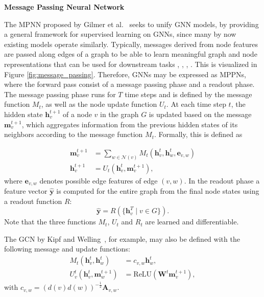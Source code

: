 \textbf{Message Passing Neural Network}\par
The \ac{MPNN} proposed by Gilmer et al.~\cite{gilmer2017neural} seeks to unify GNN models, by providing a general framework for supervised learning on GNNs, since many by now existing models operate similarly. Typically, messages derived from node features are passed along edges of a graph to be able to learn meaningful graph and node representations that can be used for downstream tasks \cite{kipf2016semi}, \cite{4700287}, \cite{velivckovic2017graph}, \cite{xu2018powerful}. This is visualized in Figure \ref{fig:message_passing}. Therefore, GNNs may be expressed as MPPNs, where the forward pass consist of a message passing phase and a readout phase. The message passing phase runs for $T$ time steps and is defined by the message function $M_t$, as well as the node update function $U_t$. At each time step $t$, the hidden state $\mathbf{h}_v^{t+1}$ of a node $v$ in the graph $G$ is updated based on the message $\mathbf{m}_v^{t+1}$, which aggregates information from the previous hidden states of its neighbors according to the message function $M_t$. Formally, this is defined as

\begin{align}
    \mathbf{m}_v^{t+1} &= \sum_{w \in \mathcal{N}(v)} M_t\left(\mathbf{h}_v^t, \mathbf{h}_w^t, \mathbf{e}_{v,w}\right) \\
    \mathbf{h}_v^{t+1} &= U_t\left(\mathbf{h}_v^t, \mathbf{m}_v^{t+1}\right),
\end{align}
where $\mathbf{e}_{v,w}$ denotes possible edge features of edge $(v,w)$.
In the readout phase a feature vector $\hat{\mathbf{y}}$ is computed for the entire graph from the final node states  using a readout function $R$:
\begin{equation}
    \hat{\mathbf{y}} = R\left(\{ \mathbf{h}_v^T \mid v \in G \}\right).
\end{equation}
Note that the three functions $M_t$, $U_t$ and $R_t$ are learned and differentiable.
    
The \ac{GCN} by Kipf and Welling~\cite{kipf2016semi}, for example, may also be defined with the following message and update functions:
\begin{align}
    M_t(\mathbf{h}_v^t, \mathbf{h}_w^t) &= c_{v,w}\mathbf{h}_w^t, \\
    U_v^t(\mathbf{h}_v^t, \mathbf{m}_w^{t+1}) &= \text{ReLU}(\mathbf{W}^t\mathbf{m}_v^{t+1}),
\end{align}
with $c_{v,w} = (d(v)d(w))^{-\frac{1}{2}}\mathbf{A}_{v,w}$.

